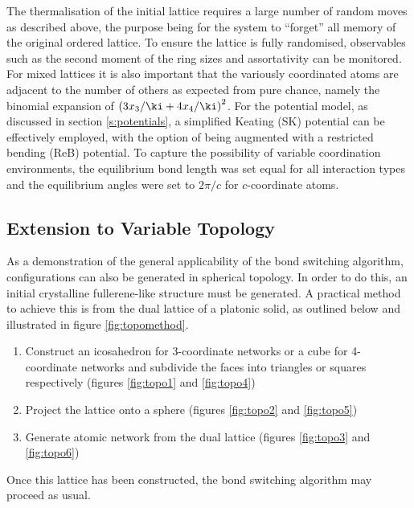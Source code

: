 The thermalisation of the initial lattice requires a large number of random moves as described above, the purpose being for the system to ``forget'' all memory of the original ordered lattice. 
To ensure the lattice is fully randomised, observables such as the second moment of the ring sizes and assortativity can be monitored. For mixed lattices it is also important that the variously coordinated atoms are adjacent to the number of others as expected from pure chance, namely the binomial expansion of $\left(3x_3/\ki+4x_4/\ki\right)^2$.
For the potential model, as discussed in section \ref{s:potentials}, a simplified Keating (SK) potential can be effectively employed, with the option of being augmented with a restricted bending (ReB) potential.
To capture the possibility of variable coordination environments, the equilibrium bond length was set equal for all interaction types and the equilibrium angles were set to $2\pi/c$ for $c$-coordinate atoms.

\subsection{Extension to Variable Topology}

As a demonstration of the general applicability of the bond switching algorithm, configurations can also be generated in spherical topology.
In order to do this, an initial crystalline fullerene\--like structure must be generated. 
A practical method to achieve this is from the dual lattice of a platonic solid, as outlined below and illustrated in figure \ref{fig:topomethod}.
\begin{enumerate}
	\item Construct an icosahedron for 3\--coordinate networks or a cube for 4\--coordinate networks and subdivide the faces into triangles or squares respectively (figures \ref{fig:topo1} and \ref{fig:topo4})
	\item Project the lattice onto a sphere (figures \ref{fig:topo2} and \ref{fig:topo5})
	\item Generate atomic network from the dual lattice (figures \ref{fig:topo3} and \ref{fig:topo6})
\end{enumerate}
Once this lattice has been constructed, the bond switching algorithm may proceed as usual.

